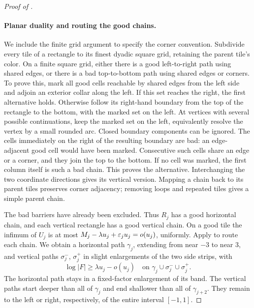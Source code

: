 \begin{proof}[Proof of ]
\paragraph{Planar duality and routing the good chains.}
We include the finite grid argument to specify the corner convention.
Subdivide every tile of a rectangle to its finest dyadic square grid,
retaining the parent tile's color.  On a finite square grid, either
there is a good left-to-right path using shared edges, or there is a
bad top-to-bottom path using shared edges or corners.  To prove this,
mark all good cells reachable by shared edges from the left side and
adjoin an exterior collar along the left.  If this set reaches the
right, the first alternative holds.  Otherwise follow its right-hand
boundary from the top of the rectangle to the bottom, with the marked
set on the left.  At vertices with several possible continuations,
keep the marked set on the left, equivalently resolve the vertex by a
small rounded arc.  Closed boundary components can be ignored.  The
cells immediately on the right of the resulting boundary are bad:
an edge-adjacent good cell would have been marked.  Consecutive such
cells share an edge or a corner, and they join the top to the bottom.
If no cell was marked, the first column itself is such a bad chain.
This proves the alternative.  Interchanging the two coordinate
directions gives its vertical version.  Mapping a chain back to its
parent tiles preserves corner adjacency; removing loops and repeated
tiles gives a simple parent chain.

The bad barriers have already been excluded.  Thus \(R_j\) has a good
horizontal chain, and each vertical rectangle has a good vertical
chain.  On a good tile the infimum of \(U_j\) is at most
\(M_j-\lambda u_j+\varepsilon_j u_j=o(u_j)\), uniformly.  Apply
 to route each chain.  We obtain a horizontal
path \(\gamma_j\), extending from near \(-3\) to near \(3\), and
vertical paths \(\sigma_j^-\), \(\sigma_j^+\) in slight enlargements
of the two side strips, with
\begin{equation}
 \log|F|\ge\lambda u_j-o(u_j)
 \quad\text{on }\gamma_j\cup\sigma_j^-\cup\sigma_j^+.
 \label{model:mesh-path-height}
\end{equation}
The horizontal path stays in a fixed-factor enlargement of its band.
The vertical paths start deeper than all of \(\gamma_j\) and end
shallower than all of \(\gamma_{j+2}\).  They remain to the left or
right, respectively, of the entire interval \([-1,1]\).


\end{proof}
